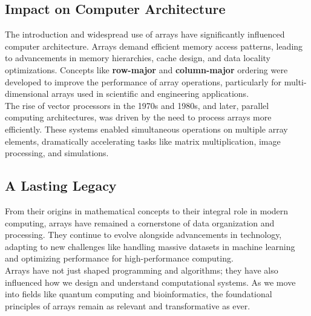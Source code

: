 \documentclass[12pt, oneside]{book}
\begin{document}
	\subsection{Impact on Computer Architecture}
	The introduction and widespread use of arrays have significantly influenced computer architecture. Arrays demand efficient memory access patterns, leading to advancements in memory hierarchies, cache design, and data locality optimizations. Concepts like \textbf{row-major} and \textbf{column-major} ordering were developed to improve the performance of array operations, particularly for multi-dimensional arrays used in scientific and engineering applications.\\
	The rise of vector processors in the 1970s and 1980s, and later, parallel computing architectures, was driven by the need to process arrays more efficiently. These systems enabled simultaneous operations on multiple array elements, dramatically accelerating tasks like matrix multiplication, image processing, and simulations.\\
	\subsection{A Lasting Legacy}
	From their origins in mathematical concepts to their integral role in modern computing, arrays have remained a cornerstone of data organization and processing. They continue to evolve alongside advancements in technology, adapting to new challenges like handling massive datasets in machine learning and optimizing performance for high-performance computing.\\
	Arrays have not just shaped programming and algorithms; they have also influenced how we design and understand computational systems. As we move into fields like quantum computing and bioinformatics, the foundational principles of arrays remain as relevant and transformative as ever.
\end{document}
